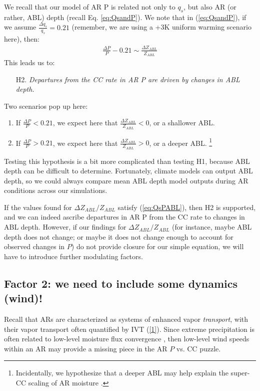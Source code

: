 \documentclass[letterpaper,12pt]{article}
\begin{document}
We recall that our model of AR P is related not only to $q_s$, but also AR (or rather, ABL) depth (recall Eq. \ref{eq:QsandP}). We note that in (\ref{eq:QsandP}), if we assume $\frac{\Delta q_s}{q_s} = 0.21$ (remember, we are using a +3K uniform warming scenario here), then:
\begin{align}\label{eq:QsPABL}
    \frac{\Delta P}{P} - 0.21 \sim \frac{\Delta Z_{ABL}}{Z_{ABL}}
\end{align}
This leads us to:
\begin{itemize}
    \item[H2.] \textit{Departures from the CC rate in AR P are driven by changes in ABL depth.}
\end{itemize}
Two scenarios pop up here: 
\begin{enumerate}
    \item If $\frac{\Delta P}{P} < 0.21$, we expect here that $\frac{\Delta Z_{ABL}}{Z_{ABL}} < 0$, or a shallower ABL.
    \item  If $\frac{\Delta P}{P} > 0.21$, we expect here that $\frac{\Delta Z_{ABL}}{Z_{ABL}} > 0$, or a deeper ABL. \footnote{Incidentally, we hypothesize that a deeper ABL may help explain the super-CC scaling of AR moisture \cite{Gao2015}.}
\end{enumerate}
Testing this hypothesis is a bit more complicated than testing H1, because ABL depth can be difficult to determine. Fortunately, climate models can output ABL depth, so we could always compare mean ABL depth model outputs during AR conditions across our simulations. 

If the values found for $\Delta Z_{ABL}/Z_{ABL}$ satisfy (\ref{eq:QsPABL}), then H2 is supported, and we can indeed ascribe departures in AR P from the CC rate to changes in ABL depth. However, if our findings for $\Delta Z_{ABL}/Z_{ABL}$ (for instance, maybe ABL depth does not change; or maybe it does not change enough to account for observed changes in $P$) do not provide closure for our simple equation, we will have to introduce further modulating factors. 

\subsection{Factor 2: we need to include some dynamics (wind)!}

Recall that ARs are characterized as systems of enhanced vapor \textit{transport}, with their vapor transport often quantified by IVT (\ref{1}). Since extreme precipitation is often related to low-level moisture flux convergence \cite{Trenberth2003ThePrecipitation}, then low-level wind speeds within an AR may provide a missing piece in the AR $P$ vs. CC puzzle.
\end{document}

